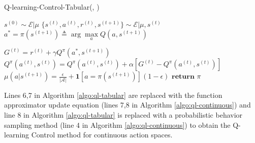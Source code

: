 \documentclass[11pt]{article}
\begin{document}
\begin{algorithm}[H]
\caption{Q-learning-Control-Tabular(\mu, \epsilon)}
\label{algo:ql-tabular}
\begin{algorithmic}[1]

\STATE $s^{(0)} \sim \mathcal{E}|\mu$
\vspace{0.15cm}
\vspace{0.15cm}
\STATE $\{s^{(t)}, a^{(t)}, r^{(t)}, s^{(t+1)}\} \sim \mathcal{E}|\mu, s^{(t)}$
\vspace{0.15cm}
\STATE $a^* = \pi(s^{(t+1)}) \triangleq \arg \max\limits_a Q(a, s^{(t+1)})$
\vspace{0.15cm}

\STATE $G^{(t)} = r^{(t)} + \gamma Q^{\pi}(a^{*}, s^{(t+1)})$\\
\vspace{0.15cm}
\STATE $Q^{\pi}(a^{(t)}, s^{(t)}) = Q^{\pi}(a^{(t)}, s^{(t)}) + \alpha\left[ G^{(t)} - Q^{\pi}(a^{(t)}, s^{(t)})\right]$\\
\vspace{0.15cm}
\STATE $\mu(a|s^{(t+1)}) = \frac{\epsilon}{|\mathcal{A}|} + \mathbf{1}\left[ a = \pi(s^{(t+1)})\right] (1-\epsilon)$
\vspace{0.15cm}
\ENDFOR
\ENDFOR
\STATE $\textbf{return } \pi$
\end{algorithmic}
\end{algorithm}

Lines 6,7 in Algorithm \ref{algo:ql-tabular} are replaced with the function approximator update equation (lines 7,8 in Algorithm \ref{algo:ql-continuous}) and line 8 in Algorithm \ref{algo:ql-tabular} is replaced with a probabilistic behavior sampling method (line 4 in Algorithm \ref{algo:ql-continuous}) to obtain the Q-learning Control method for continuous action spaces.
\end{document}
